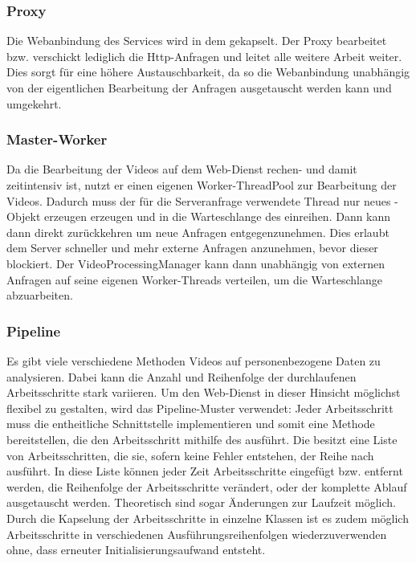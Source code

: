 \subsubsection{Proxy} \label{service:pattern:proxy}
Die Webanbindung des Services wird in dem  gekapselt. Der Proxy bearbeitet bzw. verschickt lediglich die Http-Anfragen und leitet alle weitere Arbeit weiter. Dies sorgt für eine höhere Austauschbarkeit, da so die Webanbindung unabhängig von der eigentlichen Bearbeitung der Anfragen ausgetauscht werden kann und umgekehrt.

\subsubsection{Master-Worker} \label{service:pattern:masterworker}
Da die Bearbeitung der Videos auf dem Web-Dienst rechen- und damit zeitintensiv ist, nutzt er einen eigenen Worker-ThreadPool zur Bearbeitung der Videos. Dadurch muss der für die Serveranfrage verwendete Thread nur neues -Objekt erzeugen erzeugen und in die Warteschlange des  einreihen. Dann kann dann direkt zurückkehren um neue Anfragen entgegenzunehmen. Dies erlaubt dem Server schneller und mehr externe Anfragen anzunehmen, bevor dieser blockiert.\newline
Der VideoProcessingManager kann dann unabhängig von externen Anfragen auf seine eigenen Worker-Threads verteilen, um die Warteschlange abzuarbeiten.

\subsubsection{Pipeline} \label{service:pattern:pipeline}
Es gibt viele verschiedene Methoden Videos auf personenbezogene Daten zu analysieren. Dabei kann die Anzahl und Reihenfolge der durchlaufenen Arbeitsschritte stark variieren. Um den Web-Dienst in dieser Hinsicht möglichst flexibel zu gestalten, wird das Pipeline-Muster verwendet: \newline
Jeder Arbeitsschritt muss die entheitliche Schnittstelle  implementieren und somit eine Methode bereitstellen, die den Arbeitsschritt mithilfe des  ausführt.\newline
Die  besitzt eine Liste von Arbeitsschritten, die sie, sofern keine Fehler entstehen, der Reihe nach ausführt. In diese Liste können jeder Zeit Arbeitsschritte eingefügt bzw. entfernt werden, die Reihenfolge der Arbeitsschritte verändert, oder der komplette Ablauf ausgetauscht werden. Theoretisch sind sogar Änderungen zur Laufzeit möglich.\newline
Durch die Kapselung der Arbeitsschritte in einzelne Klassen ist es zudem möglich Arbeitsschritte in verschiedenen Ausführungsreihenfolgen wiederzuverwenden ohne, dass erneuter Initialisierungsaufwand entsteht.

